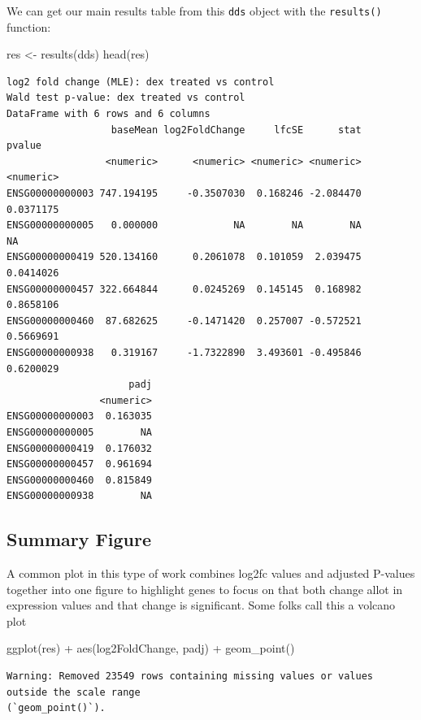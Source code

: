 \documentclass[
  letterpaper,
  DIV=11,
  numbers=noendperiod]{scrartcl}
\newenvironment{Shaded}{\begin{snugshade}}{\end{snugshade}}
\newcommand{\FunctionTok}[1]{\textcolor[rgb]{0.28,0.35,0.67}{#1}}
\newcommand{\NormalTok}[1]{\textcolor[rgb]{0.00,0.23,0.31}{#1}}
\newcommand{\OtherTok}[1]{\textcolor[rgb]{0.00,0.23,0.31}{#1}}
\newcommand{\SpecialCharTok}[1]{\textcolor[rgb]{0.37,0.37,0.37}{#1}}
\begin{document}
We can get our main results table from this \texttt{dds} object with the
\texttt{results()} function:

\begin{Shaded}
\begin{Highlighting}[]
\NormalTok{res }\OtherTok{\textless{}{-}} \FunctionTok{results}\NormalTok{(dds)}
\FunctionTok{head}\NormalTok{(res)}
\end{Highlighting}
\end{Shaded}

\begin{verbatim}
log2 fold change (MLE): dex treated vs control 
Wald test p-value: dex treated vs control 
DataFrame with 6 rows and 6 columns
                  baseMean log2FoldChange     lfcSE      stat    pvalue
                 <numeric>      <numeric> <numeric> <numeric> <numeric>
ENSG00000000003 747.194195     -0.3507030  0.168246 -2.084470 0.0371175
ENSG00000000005   0.000000             NA        NA        NA        NA
ENSG00000000419 520.134160      0.2061078  0.101059  2.039475 0.0414026
ENSG00000000457 322.664844      0.0245269  0.145145  0.168982 0.8658106
ENSG00000000460  87.682625     -0.1471420  0.257007 -0.572521 0.5669691
ENSG00000000938   0.319167     -1.7322890  3.493601 -0.495846 0.6200029
                     padj
                <numeric>
ENSG00000000003  0.163035
ENSG00000000005        NA
ENSG00000000419  0.176032
ENSG00000000457  0.961694
ENSG00000000460  0.815849
ENSG00000000938        NA
\end{verbatim}

\subsection{Summary Figure}\label{summary-figure}

A common plot in this type of work combines log2fc values and adjusted
P-values together into one figure to highlight genes to focus on that
both change allot in expression values and that change is significant.
Some folks call this a volcano plot

\begin{Shaded}
\begin{Highlighting}[]
\FunctionTok{ggplot}\NormalTok{(res) }\SpecialCharTok{+}
  \FunctionTok{aes}\NormalTok{(log2FoldChange, padj) }\SpecialCharTok{+} \FunctionTok{geom\_point}\NormalTok{()}
\end{Highlighting}
\end{Shaded}

\begin{verbatim}
Warning: Removed 23549 rows containing missing values or values outside the scale range
(`geom_point()`).
\end{verbatim}
\end{document}
